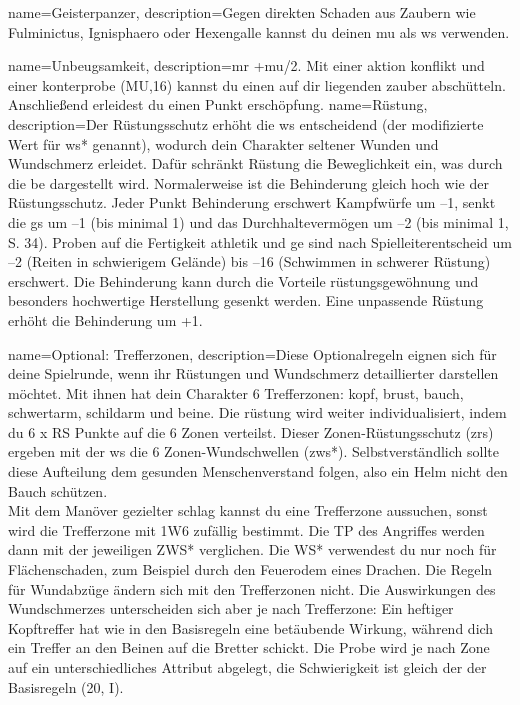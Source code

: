 {
    name={Geisterpanzer},
    description={Gegen direkten Schaden aus Zaubern wie Fulminictus, Ignisphaero oder Hexengalle kannst du deinen \gls{mu} als \gls{ws} verwenden.}}

{
    name={Unbeugsamkeit},
    description={\gls{mr} +\gls{mu}/2. Mit einer \gls{aktion} \gls{konflikt} und einer \gls{konterprobe} (MU,16) kannst du einen auf dir liegenden \gls{zauber} abschütteln. Anschließend erleidest du einen Punkt \gls{erschöpfung}.}}
{
    name={Rüstung},
description={Der Rüstungsschutz erhöht die \gls{ws} entscheidend (der modifizierte Wert für \gls{ws}* genannt), wodurch dein Charakter seltener Wunden und Wundschmerz erleidet. Dafür schränkt Rüstung die Beweglichkeit ein, was durch die \gls{be} dargestellt wird. Normalerweise ist die Behinderung gleich hoch wie der Rüstungsschutz. Jeder Punkt Behinderung erschwert Kampfwürfe um –1, senkt die \gls{gs} um –1 (bis minimal 1) und das Durchhaltevermögen um –2 (bis minimal 1, S. 34). Proben auf die Fertigkeit \gls{athletik} und \gls{ge} sind nach Spielleiterentscheid um –2 (Reiten in schwierigem Gelände) bis –16 (Schwimmen in schwerer Rüstung) erschwert. Die Behinderung kann durch die Vorteile \gls{rüstungsgewöhnung} und besonders hochwertige Herstellung gesenkt werden. Eine unpassende Rüstung erhöht die Behinderung um +1.}}

{
    name={Optional: Trefferzonen},
    description={Diese Optionalregeln eignen sich für deine Spielrunde, wenn ihr Rüstungen und Wundschmerz detaillierter darstellen möchtet. Mit ihnen hat dein Charakter 6 Trefferzonen: \gls{kopf}, \gls{brust}, \gls{bauch}, \gls{schwertarm}, \gls{schildarm} und \gls{beine}. Die \gls{rüstung} wird weiter individualisiert, indem du 6 x RS Punkte auf die 6 Zonen verteilst. Dieser Zonen-Rüstungsschutz (\gls{zrs}) ergeben mit der \gls{ws} die 6 Zonen-Wundschwellen (\gls{zws}*). Selbstverständlich sollte diese Aufteilung dem gesunden Menschenverstand folgen, also ein Helm nicht den Bauch schützen.\\
Mit dem Manöver \gls{gezielter schlag} kannst du eine Trefferzone aussuchen, sonst wird die Trefferzone mit 1W6 zufällig bestimmt. Die TP des Angriffes werden dann mit der jeweiligen ZWS* verglichen. Die WS* verwendest du nur noch für Flächenschaden, zum Beispiel durch den Feuerodem eines Drachen. Die Regeln für Wundabzüge ändern sich mit den Trefferzonen nicht. Die Auswirkungen des Wundschmerzes unterscheiden sich aber je nach Trefferzone: Ein heftiger Kopftreffer hat wie in den Basisregeln eine betäubende Wirkung, während dich ein Treffer an den Beinen auf die Bretter schickt. Die Probe wird je nach Zone auf ein unterschiedliches Attribut abgelegt, die Schwierigkeit ist gleich der der Basisregeln (20, I).}}

